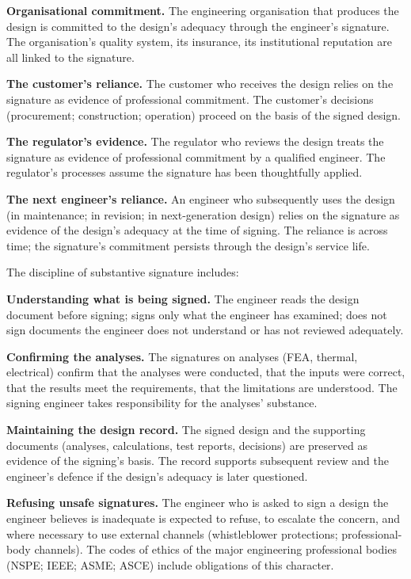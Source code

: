 \textbf{Organisational commitment.} The engineering organisation that produces the design is committed to the design's adequacy through the engineer's signature. The organisation's quality system, its insurance, its institutional reputation are all linked to the signature.

\textbf{The customer's reliance.} The customer who receives the design relies on the signature as evidence of professional commitment. The customer's decisions (procurement; construction; operation) proceed on the basis of the signed design.

\textbf{The regulator's evidence.} The regulator who reviews the design treats the signature as evidence of professional commitment by a qualified engineer. The regulator's processes assume the signature has been thoughtfully applied.

\textbf{The next engineer's reliance.} An engineer who subsequently uses the design (in maintenance; in revision; in next-generation design) relies on the signature as evidence of the design's adequacy at the time of signing. The reliance is across time; the signature's commitment persists through the design's service life.

The discipline of substantive signature includes:

\textbf{Understanding what is being signed.} The engineer reads the design document before signing; signs only what the engineer has examined; does not sign documents the engineer does not understand or has not reviewed adequately.

\textbf{Confirming the analyses.} The signatures on analyses (FEA, thermal, electrical) confirm that the analyses were conducted, that the inputs were correct, that the results meet the requirements, that the limitations are understood. The signing engineer takes responsibility for the analyses' substance.

\textbf{Maintaining the design record.} The signed design and the supporting documents (analyses, calculations, test reports, decisions) are preserved as evidence of the signing's basis. The record supports subsequent review and the engineer's defence if the design's adequacy is later questioned.

\textbf{Refusing unsafe signatures.} The engineer who is asked to sign a design the engineer believes is inadequate is expected to refuse, to escalate the concern, and where necessary to use external channels (whistleblower protections; professional-body channels). The codes of ethics of the major engineering professional bodies (NSPE; IEEE; ASME; ASCE) include obligations of this character.

